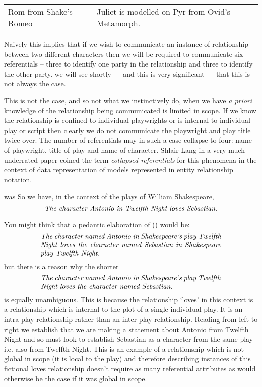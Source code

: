 \begin{tabular}{l}
Rom from Shake's Romeo & Juliet
                           is modelled on Pyr from Ovid's Metamorph.
\end{tabular}

\mynote %
Naively this implies that if we wish to communicate an instance of relationship between two different characters then we will be required to communicate six referentials
 -- three to identify one party in the relationship and three to identify the other party. 
 we will see shortly  --- and this is very significant --- that this is not always the case.

\mynote
 This is not the case, and so not what we instinctively do, when we have \textit{a priori} knowledge of the relationship being communicated is limited in scope. If we know the relationship is confined to individual playwrights or is internal to individual play or script then clearly we do not 
  communicate the playwright and play title twice over. The number of referentials may in such a case collapse to four: name of playwright, title of play and name of character.
Shlair-Lang in a very much underrated paper coined the term \textit{collapsed referentials} for this phenomena in the context of data representation of models represented in entity relationship notation.

\mynote was %
So we have, in the context of the plays of William Shakespeare,
\begin{equation}
\label{AntonioLovesSebastian2}
\mbox{\textit{The character Antonio in Twelfth Night loves Sebastian.}}
\end{equation} 

You might think that a pedantic elaboration of (\label{AntonioLovesSebastian}) would be:
\begin{equation}
\text{\parbox{9cm}{\textit{The character named Antonio in Shakespeare's play Twelfth Night loves the character named Sebastian in Shakespeare play Twelfth Night.}}}
\end{equation} 
but there is a reason why the shorter
\begin{equation}
\text{\parbox{9cm}{\textit{The character named Antonio in Shakespeare's play Twelfth Night loves the character named Sebastian.}}}
\end{equation} 
is equally unambiguous. This is because the relationship `loves' in this context is a relationship which is internal to the plot of a single individual play. 
It is an intra-play relationship rather than an inter-play relationship.
Reading from left to right we establish that we are making a statement about 
Antonio from Twelfth Night  and so must look to establish Sebastian as a character from the same play i.e. also from Twelfth Night. This is an example of a relationship which is not global in scope (it is local to the play) and therefore describing instances of this fictional loves relationship
doesn't require as many referential attributes as would otherwise be the case if it was global in scope. 

